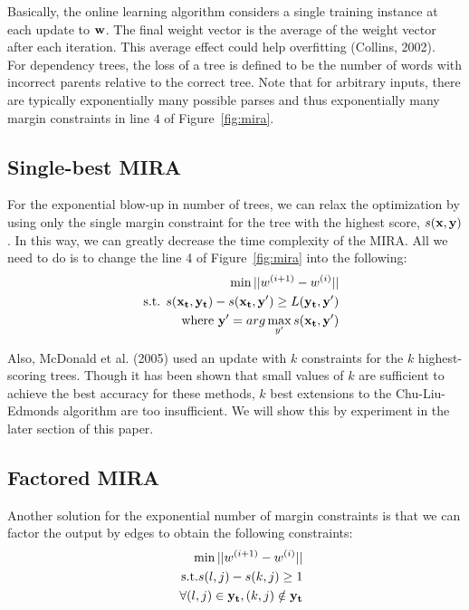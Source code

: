 \documentclass[12pt]{article}
\begin{document}
Basically, the online learning algorithm considers a single training instance at each update to ${\bf w}$. The final weight vector is the average of the weight vector after each iteration. This average effect could help overfitting (Collins, 2002). \\

For dependency trees, the loss of a tree is defined to be the number of words with incorrect parents relative to the correct tree. Note that for arbitrary inputs, there are typically exponentially many possible parses and thus exponentially many margin constraints in line $4$ of Figure~\ref{fig:mira}.

\subsection{Single-best MIRA} 

For the exponential blow-up in number of trees, we can relax the optimization by using only the single margin constraint for the tree with the highest score, $s({\bf x, y})$. In this way, we can greatly decrease the time complexity of the MIRA. All we need to do is to change the line 4 of Figure~\ref{fig:mira} into the following:
\begin{eqnarray*}
&& \min ||w^{(i+1)} - w^{(i)}|| \\
&& \text {s.t. } s({\bf x_t, y_t}) - s({\bf x_t, y'}) \ge L({\bf y_t, y'}) \\ 
&& \text {where } {\bf y'} = arg \max_{y'} s({\bf x_t, y'})
\end{eqnarray*}

Also, McDonald et al. (2005) used an update with $k$ constraints for the $k$ highest-scoring trees. Though it has been shown that small values of $k$ are sufficient to achieve the best accuracy for these methods, $k$ best extensions to the Chu-Liu-Edmonds algorithm are too insufficient. We will show this by experiment in the later section of this paper.

\subsection{Factored MIRA}

Another solution for the exponential number of margin constraints is that we can factor the output by edges to obtain the following constraints:
\begin{eqnarray*}
&& \min ||w^{(i+1)} - w^{(i)}|| \\
&& \text {s.t.} s(l,j) - s(k, j) \ge 1 \\
&& \forall (l,j) \in {\bf y_t}, (k,j) \notin {\bf y_t}
\end{eqnarray*}
\end{document}
